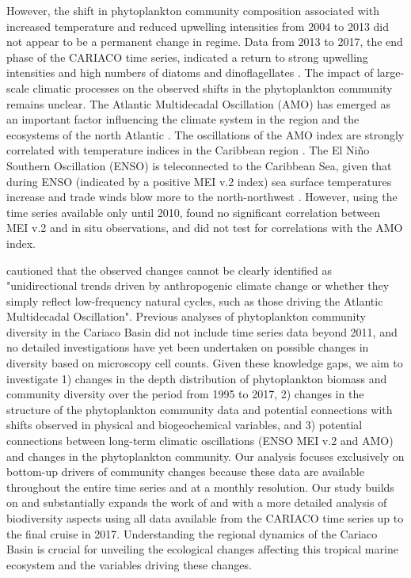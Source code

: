 \documentclass[draft]{agujournal2019}
\begin{document}
However, the shift in phytoplankton community composition associated with increased temperature and reduced upwelling intensities from 2004 to 2013 did not appear to be a permanent change in regime. Data from 2013 to 2017, the end phase of the CARIACO time series, indicated a return to strong upwelling intensities and high numbers of diatoms and dinoflagellates \cite{muller-karger_scientific_2019}. The impact of large-scale climatic processes on the observed shifts in the phytoplankton community remains unclear. The Atlantic Multidecadal Oscillation (AMO) has emerged as an important factor influencing the climate system in the region and the ecosystems of the north Atlantic \cite{nye_ecosystem_2014}. The oscillations of the AMO index are strongly correlated with temperature indices in the Caribbean region \cite{stephenson_changes_2014}. The El Niño Southern Oscillation (ENSO) is teleconnected to the Caribbean Sea, given that during ENSO (indicated by a positive MEI v.2 index) sea surface temperatures increase and trade winds blow more to the north-northwest \cite{enfield_tropical_1997}. However, using the time series available only until 2010,  found no significant correlation between MEI v.2 and in situ observations, and did not test for correlations with the AMO index.

 cautioned that the observed changes cannot be clearly identified as "unidirectional trends driven by anthropogenic climate change or whether they simply reflect low-frequency natural cycles, such as those driving the Atlantic Multidecadal Oscillation". Previous analyses of phytoplankton community diversity in the Cariaco Basin did not include time series data beyond 2011, and no detailed investigations have yet been undertaken on possible changes in diversity based on microscopy cell counts. Given these knowledge gaps, we aim to investigate 1) changes in the depth distribution of phytoplankton biomass and community diversity over the period from 1995 to 2017, 2) changes in the structure of the phytoplankton community data and potential connections with shifts observed in physical and biogeochemical variables, and 3) potential connections between long-term climatic oscillations (ENSO MEI v.2 and AMO) and changes in the phytoplankton community. Our analysis focuses exclusively on bottom-up drivers of community changes because these data are available throughout the entire time series and at a monthly resolution. Our study builds on and substantially expands the work of  and  with a more detailed analysis of biodiversity aspects using all data available from the CARIACO time series up to the final cruise in 2017. Understanding the regional dynamics of the Cariaco Basin is crucial for unveiling the ecological changes affecting this tropical marine ecosystem and the variables driving these changes. 
        
\end{document}
